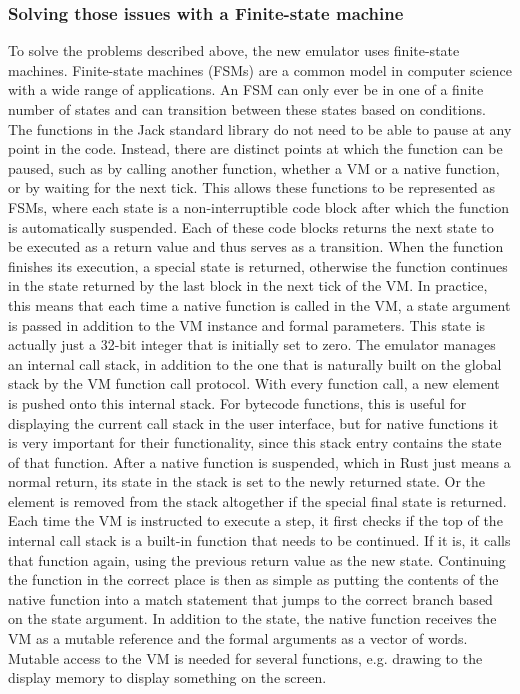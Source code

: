 
\subsubsection{Solving those issues with a Finite-state machine}
To solve the problems described above, the new emulator uses finite-state machines.
Finite-state machines (FSMs) are a common model in computer science with a wide range of applications. An FSM can only ever be in one of a finite number of states and can transition between these states based on conditions.
The functions in the Jack standard library do not need to be able to pause at any point in the code. Instead, there are distinct points at which the function can be paused, such as by calling another function, whether a VM or a native function, or by waiting for the next tick.
This allows these functions to be represented as FSMs, where each state is a non-interruptible code block after which the function is automatically suspended. Each of these code blocks returns the next state to be executed as a return value and thus serves as a transition.
When the function finishes its execution, a special state is returned, otherwise the function continues in the state returned by the last block in the next tick of the VM.
In practice, this means that each time a native function is called in the VM, a state argument is passed in addition to the VM instance and formal parameters.
This state is actually just a 32-bit integer that is initially set to zero.
The emulator manages an internal call stack, in addition to the one that is naturally built on the global stack by the VM function call protocol.
With every function call, a new element is pushed onto this internal stack. For bytecode functions, this is useful for displaying the current call stack in the user interface, but for native functions it is very important for their functionality, since this stack entry contains the state of that function.
After a native function is suspended, which in Rust just means a normal return, its state in the stack is set to the newly returned state. Or the element is removed from the stack altogether if the special final state is returned.
Each time the VM is instructed to execute a step, it first checks if the top of the internal call stack is a built-in function that needs to be continued. If it is, it calls that function again, using the previous return value as the new state.
Continuing the function in the correct place is then as simple as putting the contents of the native function into a match statement that jumps to the correct branch based on the state argument.
In addition to the state, the native function receives the VM as a mutable reference and the formal arguments as a vector of words.
Mutable access to the VM is needed for several functions, e.g. drawing to the display memory to display something on the screen.

